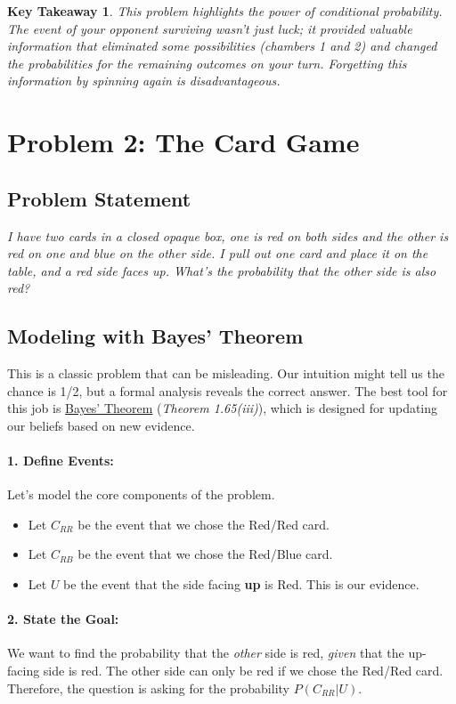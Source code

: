 \documentclass[11pt,a4paper]{article}
\theoremstyle{tutorstyle}
\newtheorem*{takeaway}{Key Takeaway}
\newcommand{\concept}[2]{\hyperlink{#1}{#2}}
\begin{document}
\begin{takeaway}
This problem highlights the power of conditional probability. The event of your opponent surviving wasn't just luck; it provided valuable information that eliminated some possibilities (chambers 1 and 2) and changed the probabilities for the remaining outcomes on your turn. Forgetting this information by spinning again is disadvantageous.
\end{takeaway}

\newpage

\section{Problem 2: The Card Game}

\subsection{Problem Statement}
\textit{I have two cards in a closed opaque box, one is red on both sides and the other is red on one and blue on the other side. I pull out one card and place it on the table, and a red side faces up. What’s the probability that the other side is also red?}

\subsection{Modeling with Bayes' Theorem}
This is a classic problem that can be misleading. Our intuition might tell us the chance is 1/2, but a formal analysis reveals the correct answer. The best tool for this job is \concept{concept_bayes}{Bayes' Theorem} (\textit{Theorem 1.65(iii)}), which is designed for updating our beliefs based on new evidence.

\paragraph{1. Define Events:}
Let's model the core components of the problem.
\begin{itemize}
    \item Let $C_{RR}$ be the event that we chose the Red/Red card.
    \item Let $C_{RB}$ be the event that we chose the Red/Blue card.
    \item Let $U$ be the event that the side facing \textbf{up} is Red. This is our evidence.
\end{itemize}

\paragraph{2. State the Goal:}
We want to find the probability that the \textit{other} side is red, \textit{given} that the up-facing side is red. The other side can only be red if we chose the Red/Red card. Therefore, the question is asking for the probability $P(C_{RR} | U)$.
\end{document}
